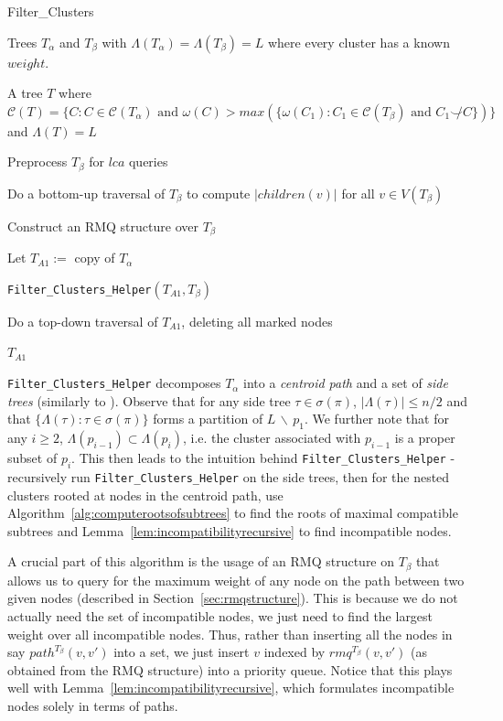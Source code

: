 \documentclass{article}
\newcommand{\compatible}{\smile}
\newcommand{\leafset}{\Lambda}
\newcommand{\weight}{\omega}
\begin{document}
    \begin{algorithm}
        \caption{Filter\_Clusters}
        \begin{algorithmic}[1]
            \Input Trees $T_\alpha$ and $T_\beta$ with $\leafset(T_\alpha) = \leafset(T_\beta) = L$ where every cluster has a known $weight$.

            \Output A tree $T$ where $\mathcal{C}(T) = \{C : C \in \mathcal{C}(T_\alpha) \text{ and } \weight(C) > max(\{\weight(C_1) : C_1 \in \mathcal{C}(T_\beta) \text{ and } C_1 \not\compatible C\})\}$ and $\leafset(T) = L$

            \State Preprocess $T_\beta$ for $lca$ queries

            \State Do a bottom-up traversal of $T_\beta$ to compute $|children(v)|$ for all $v \in V(T_\beta)$

            \State Construct an RMQ structure over $T_\beta$

            \State Let $T_{A1} :=$ copy of $T_\alpha$

            \State \texttt{Filter\_Clusters\_Helper}$(T_{A1}, T_\beta)$

            \State Do a top-down traversal of $T_{A1}$, deleting all marked nodes

            \State \Return $T_{A1}$
        \end{algorithmic}
    \end{algorithm}

    \texttt{Filter\_Clusters\_Helper} decomposes $T_\alpha$ into a \textit{centroid path} and a set of \textit{side trees} (similarly to \cite{jansson2018algorithms}). Observe that for any side tree $\tau \in \sigma(\pi)$, $|\leafset(\tau)| \leq n/2$ and that $\{\leafset(\tau) : \tau \in \sigma(\pi)\}$ forms a partition of $L\, \backslash\, {p_1}$. We further note that for any $i \geq 2$, $\leafset(p_{i - 1}) \subset \leafset(p_i)$, i.e. the cluster associated with $p_{i-1}$ is a proper subset of $p_i$. This then leads to the intuition behind \texttt{Filter\_Clusters\_Helper} - recursively run \texttt{Filter\_Clusters\_Helper} on the side trees, then for the nested clusters rooted at nodes in the centroid path, use Algorithm~\ref{alg:computerootsofsubtrees} to find the roots of maximal compatible subtrees and Lemma~\ref{lem:incompatibilityrecursive} to find incompatible nodes.

    A crucial part of this algorithm is the usage of an RMQ structure on $T_\beta$ that allows us to query for the maximum weight of any node on the path between two given nodes (described in Section~\ref{sec:rmqstructure}). This is because we do not actually need the set of incompatible nodes, we just need to find the largest weight over all incompatible nodes. Thus, rather than inserting all the nodes in say $path^{T_\beta}(v, v')$ into a set, we just insert $v$ indexed by $rmq^{T_\beta}(v, v')$ (as obtained from the RMQ structure) into a priority queue. Notice that this plays well with Lemma~\ref{lem:incompatibilityrecursive}, which formulates incompatible nodes solely in terms of paths.
\end{document}
